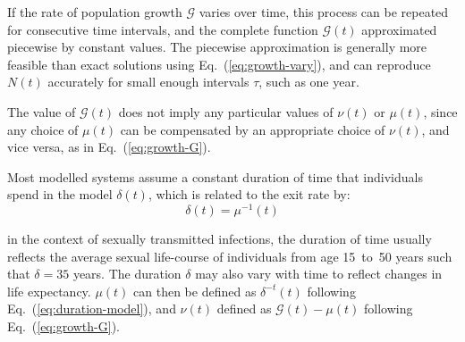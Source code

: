 If the rate of population growth $\mathcal{G}$ varies over time,
this %
process can be repeated for consecutive time intervals,
and the complete function $\mathcal{G}(t)$ approximated piecewise by constant values.
The piecewise approximation is generally more feasible than exact solutions using Eq.~(\ref{eq:growth-vary}),
and can reproduce $N(t)$ accurately for small enough intervals $\tau$,
such as one year.  %
\par

The value of $\mathcal{G}(t)$ does not imply any particular
values of $\nu(t)$ or $\mu(t)$,
since any choice of $\mu(t)$ can be compensated by an appropriate choice of $\nu(t)$,
and vice versa, as in Eq.~(\ref{eq:growth-G}).										%

Most modelled systems assume a constant duration of time that individuals spend in the model $\delta(t)$,  %
which is related to the exit rate by:
\begin{equation} \label{eq:duration-model}
\delta(t) = \mu^{-1}(t)
\end{equation}

in the context of sexually transmitted infections, the duration of time usually reflects
the average sexual life-course of individuals from age 15~to~50 years such that
$\delta = 35$ years. 
The duration $\delta$ may also vary with time to reflect changes in life expectancy.
$\mu(t)$ can then be defined as $\delta^{-t}(t)$
following Eq.~(\ref{eq:duration-model}),
and $\nu(t)$ defined as $\mathcal{G}(t) - \mu(t)$
following Eq.~(\ref{eq:growth-G}).

